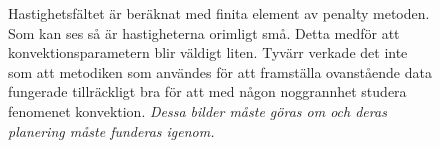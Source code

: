 \begin{figure}[hpbt]

\caption{\label{fig:velocityfield}Hastighetsfältet är beräknat med finita element av penalty metoden.
Som kan ses så är hastigheterna orimligt små. Detta medför att konvektionsparametern
blir väldigt liten. Tyvärr verkade det inte som att metodiken som användes för
att framställa ovanstående data fungerade tillräckligt bra för att med någon noggrannhet studera fenomenet konvektion. \emph{\color{red} Dessa bilder måste göras om och deras planering måste funderas igenom.}}

\end{figure}

